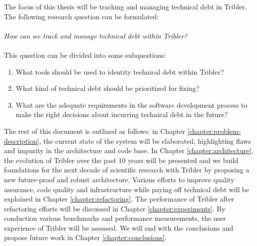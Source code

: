 The focus of this thesis will be tracking and managing technical debt in Tribler. The following research question can be formulated:\\\\
\emph{How can we track and manage technical debt within Tribler?}\\\\
This question can be divided into some subquestions:
\begin{enumerate}
	\item What tools should be used to identity technical debt within Tribler?
	\item What kind of technical debt should be prioritized for fixing?
	\item What are the adequate requirements in the software development process to make the right decisions about incurring technical debt in the future?
\end{enumerate}

The rest of this document is outlined as follows: in Chapter \ref{chapter:problem-description}, the current state of the system will be elaborated, highlighting flaws and impurity in the architecture and code base. 
In Chapter \ref{chapter:architecture}, the evolution of Tribler over the past 10 years will be presented and we build foundations for the next decade of scientific research with Tribler by proposing a new future-proof and robust architecture.
Various efforts to improve quality assurance, code quality and infrastructure while paying off technical debt will be explained in Chapter \ref{chapter:refactoring}.
The performance of Tribler after refactoring efforts will be discussed in Chapter \ref{chapter:experiments}.
By conduction various benchmarks and performance measurements, the user experience of Tribler will be assessed.
We will end with the conclusions and propose future work in Chapter \ref{chapter:conclusions}.
